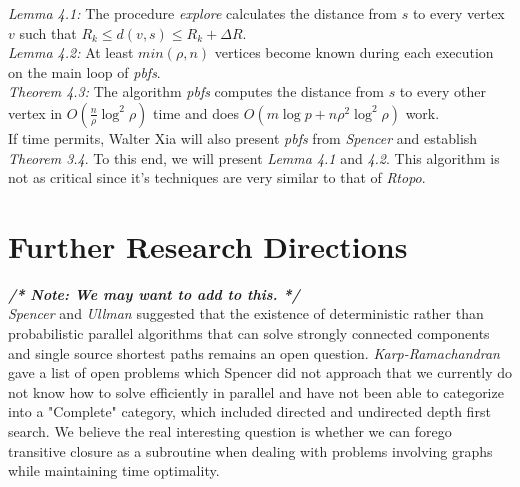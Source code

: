 \documentclass[paper=a4, fontsize=11pt]{scrartcl} %
\numberwithin{equation}{section} %
\numberwithin{figure}{section} %
\numberwithin{table}{section} %
\begin{document}
\textit{Lemma 4.1:} The procedure \textit{explore} calculates the distance from $s$ to every vertex $v$ such that $R_k \leq d(v,s) \leq R_k + \Delta{R}$.\\

\textit{Lemma 4.2:} At least $min(\rho,n)$ vertices become known during each execution on the main loop of \textit{pbfs}.\\

\textit{Theorem 4.3:} The algorithm \textit{pbfs} computes the distance from $s$ to every other vertex in $O(\frac{n}{\rho}\log^2{\rho})$ time and does $O(m\log{p} + n\rho^2\log^2{\rho})$ work.\\

If time permits, Walter Xia will also present \textit{pbfs} from \textit{Spencer\cite{S97}} and establish \textit{Theorem 3.4}. To this end, we will present \textit{Lemma 4.1} and \textit{4.2}. This algorithm is not as critical since it's techniques are very similar to that of \textit{Rtopo}.


\section{Further Research Directions}
\textbf{\textit{/* Note: We may want to add to this. */}}\\
\textit{Spencer\cite{S97}} and \textit{Ullman\cite{UY91}} suggested that the existence of deterministic rather than probabilistic parallel algorithms that can solve strongly connected components and single source shortest paths remains an open question. \textit{Karp-Ramachandran\cite{KR90}} gave a list of open problems which Spencer did not approach that we currently do not know how to solve efficiently in parallel and have not been able to categorize into a "Complete" category, which included directed and  undirected depth first search. We believe the real interesting question is whether we can forego transitive closure as a subroutine when dealing with problems involving graphs while maintaining time optimality.






\end{document}
